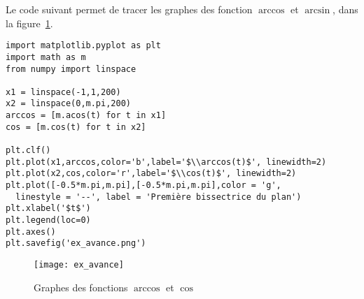 Le code suivant permet de tracer les graphes des fonction $\arccos$ et $\arcsin$, dans la figure~\ref{fig:ex_avance}.
\begin{lstlisting}
import matplotlib.pyplot as plt
import math as m
from numpy import linspace

x1 = linspace(-1,1,200)
x2 = linspace(0,m.pi,200)
arccos = [m.acos(t) for t in x1]
cos = [m.cos(t) for t in x2]

plt.clf()
plt.plot(x1,arccos,color='b',label='$\\arccos(t)$', linewidth=2)
plt.plot(x2,cos,color='r',label='$\\cos(t)$', linewidth=2)
plt.plot([-0.5*m.pi,m.pi],[-0.5*m.pi,m.pi],color = 'g', 
  linestyle = '--', label = 'Première bissectrice du plan')
plt.xlabel('$t$')
plt.legend(loc=0)
plt.axes()
plt.savefig('ex_avance.png')
\end{lstlisting}

\begin{figure}[!h]
  \begin{center}
    \texttt{[image: ex\_avance]}
    \caption{Graphes des fonctions $\arccos$ et $\cos$}
    \label{fig:ex_avance}
  \end{center}
\end{figure}  